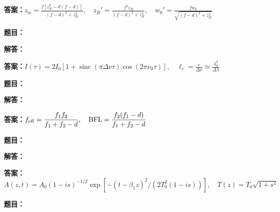 \documentclass[lang=cn,color=blue,11pt]{elegantbook}
\begin{document}
\par\noindent\textbf{答案：}\(\displaystyle z_w=\frac{f[z_R^2-d(f-d)]}{(f-d)^2+z_R^2},\quad z_R'=\frac{f^2z_R}{(f-d)^2+z_R^2},\quad w_0'=\frac{fw_0}{\sqrt{(f-d)^2+z_R^2}}\)\par
\par\smallskip\noindent\hrulefill\par\medskip
{}\par
\noindent\textbf{题目：}
\par\noindent\textbf{解答：}
\par\noindent\textbf{答案：}\(\displaystyle I(\tau)=2I_0[1+\operatorname{sinc}(\pi\Delta\nu\tau)\cos(2\pi\nu_0\tau)],\quad \ell_c=\frac c{\Delta\nu}\simeq\frac{\lambda_0^2}{\Delta\lambda}\)\par
\par\smallskip\noindent\hrulefill\par\medskip
{}\par
\noindent\textbf{题目：}
\par\noindent\textbf{解答：}
\par\noindent\textbf{答案：}\(\displaystyle f_{\rm eff}=\frac{f_1f_2}{f_1+f_2-d},\quad \mathrm{BFL}=\frac{f_2(f_1-d)}{f_1+f_2-d}\)\par
\par\smallskip\noindent\hrulefill\par\medskip
{}\par
\noindent\textbf{题目：}
\par\noindent\textbf{解答：}
\par\noindent\textbf{答案：}\(\displaystyle A(z,t)=A_0(1-is)^{-1/2}\exp[-(t-\beta_1z)^2/(2T_0^2(1-is))],\quad T(z)=T_0\sqrt{1+s^2}\)\par
\par\smallskip\noindent\hrulefill\par\medskip
{}\par
\noindent\textbf{题目：}
\end{document}
